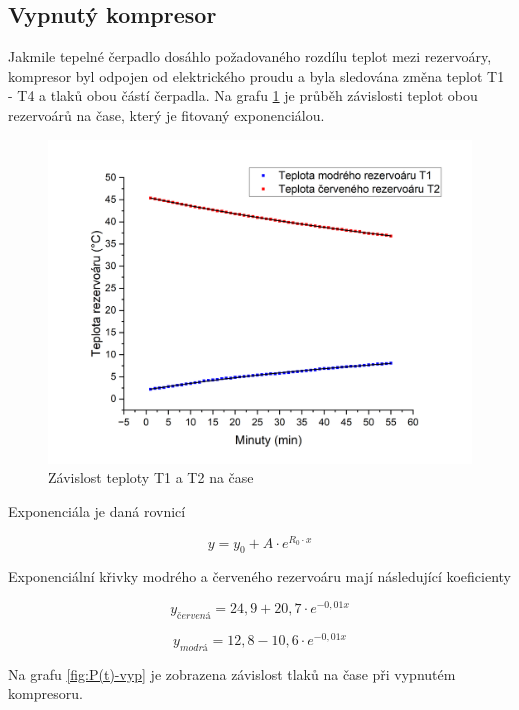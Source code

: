 \subsection{Vypnutý kompresor}

Jakmile tepelné čerpadlo dosáhlo požadovaného rozdílu teplot mezi rezervoáry, kompresor byl odpojen od elektrického proudu a byla sledována změna teplot T1 - T4 a tlaků obou částí čerpadla. Na grafu \ref{fig:T1(t),T2(t)-vyp} je průběh závislosti teplot obou rezervoárů na čase, který je fitovaný exponenciálou.

\begin{figure}[h]
    \centering
    \includegraphics[width=0.68\linewidth]{27 - Tepelné čerpadlo//Protokol_tepelné čerpadlo//img/T1(t), T2(t) vyp.png}
    \caption{Závislost teploty T1 a T2 na čase}
    \label{fig:T1(t),T2(t)-vyp}
\end{figure}

Exponenciála je daná rovnicí

\begin{equation}
    \nonumber
    y = y_0 + A \cdot e^{R_0 \cdot x}
\end{equation}

Exponenciální křivky modrého a červeného rezervoáru mají následující koeficienty

\begin{equation}
    \nonumber
    y_{červená} = 24,9 + 20,7 \cdot e^{-0,01 x}
\end{equation}

\begin{equation}
    \nonumber
    y_{modrá} = 12,8 - 10,6 \cdot e^{-0,01 x}
\end{equation}

Na grafu \ref{fig:P(t)-vyp} je zobrazena závislost tlaků na čase při vypnutém kompresoru.

